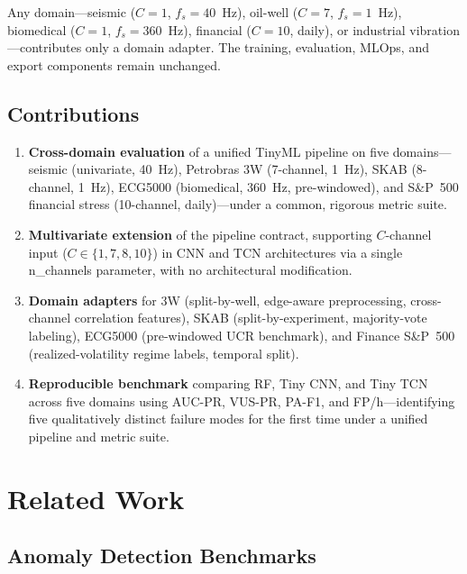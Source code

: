 \documentclass[conference]{IEEEtran}
\def\texttt#1{#1}%
\begin{document}
Any domain---seismic ($C=1$, $f_s=40$~Hz), oil-well ($C=7$, $f_s=1$~Hz),
biomedical ($C=1$, $f_s=360$~Hz), financial ($C=10$, daily), or
industrial vibration---contributes only a domain adapter.
The training, evaluation, MLOps, and export components remain unchanged.

\subsection{Contributions}

\begin{enumerate}
  \item \textbf{Cross-domain evaluation} of a unified TinyML pipeline on
        five domains---seismic (univariate, 40~Hz), Petrobras 3W (7-channel, 1~Hz),
        SKAB (8-channel, 1~Hz), ECG5000 (biomedical, 360~Hz, pre-windowed),
        and S\&P~500 financial stress (10-channel, daily)---under a common,
        rigorous metric suite.
  \item \textbf{Multivariate extension} of the pipeline contract, supporting
        $C$-channel input ($C \in \{1, 7, 8, 10\}$) in CNN and TCN
        architectures via a single \texttt{n\_channels} parameter,
        with no architectural modification.
  \item \textbf{Domain adapters} for 3W (split-by-well, edge-aware preprocessing,
        cross-channel correlation features), SKAB (split-by-experiment, majority-vote
        labeling), ECG5000 (pre-windowed UCR benchmark), and Finance S\&P~500
        (realized-volatility regime labels, temporal split).
  \item \textbf{Reproducible benchmark} comparing RF, Tiny CNN, and Tiny TCN across
        five domains using AUC-PR, VUS-PR, PA-F1, and FP/h---identifying five
        qualitatively distinct failure modes for the first time under a unified
        pipeline and metric suite.
\end{enumerate}

\section{Related Work}
\label{sec:related}

\subsection{Anomaly Detection Benchmarks}
\end{document}
